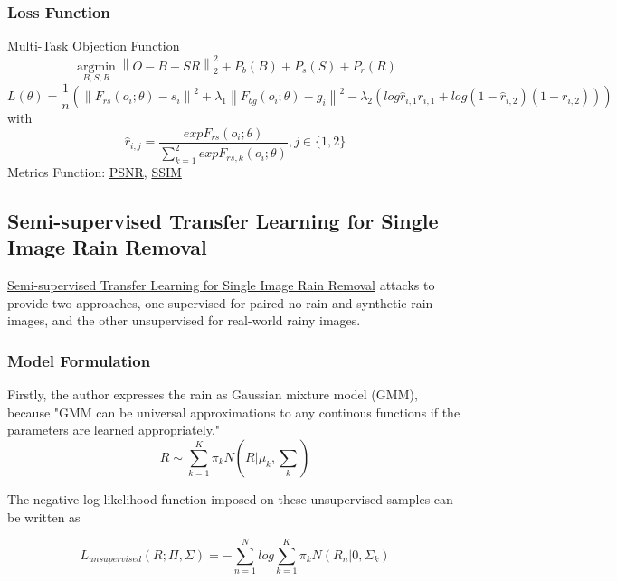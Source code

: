 \documentclass{article}
\newcommand\norm[1]{\left\lVert#1\right\rVert}
\begin{document}
\subsubsection{Loss Function}
Multi-Task Objection Function
\begin{equation}
\operatorname*{argmin}_{B,S,R}\norm{O-B-SR}_2^2+P_b(B)+P_s(S)+P_r(R)
\end{equation}
\begin{equation}
L(\theta)=\frac{1}{n}(\norm{F_{rs}(o_i;\theta)-s_i}^2+\lambda_1\norm{F_{bg}(o_i;\theta)-g_i}^2-\lambda_2(log\hat{r}_{i,1}r_{i,1}+log(1-\hat{r}_{i,2})(1-r_{i,2})))
\end{equation}
with 
\begin{equation}
\hat{r}_{i,j}=\frac{exp{F_{rs}(o_i;\theta)}}{\sum_{k=1}^{2}exp{F_{rs,k}(o_i;\theta)}},j\in{\{1,2\}}
\end{equation}
Metrics Function: \href{https://en.wikipedia.org/wiki/Peak_signal-to-noise_ratio}{PSNR}, \href{https://en.wikipedia.org/wiki/Structural_similarity}{SSIM}
\subsection{Semi-supervised Transfer Learning for Single Image Rain Removal}
\href{https://arxiv.org/pdf/1807.11078.pdf}{Semi-supervised Transfer Learning for Single Image Rain Removal} attacks to provide two approaches, one supervised for paired no-rain and synthetic rain images, and the other unsupervised for real-world rainy images.
\subsubsection{Model Formulation}
Firstly, the author expresses the rain as Gaussian mixture model (GMM), because "GMM can be universal approximations to any continous functions if the parameters are learned appropriately."
\begin{equation*}
    R \sim  \sum_{k=1}^{K}\pi_{k}N(R \vert \mu_{k}, \sum_{k})
\end{equation*}

The negative log likelihood function imposed on these unsupervised samples can be written as


\begin{equation}
    L_{unsupervised}(R;\Pi,\Sigma) =-    \sum_{n=1}^{N}log        \sum_{k=1}^{K}\pi_{k}N(R_n \vert 0,\Sigma_{k})
\end{equation}
\end{document}
